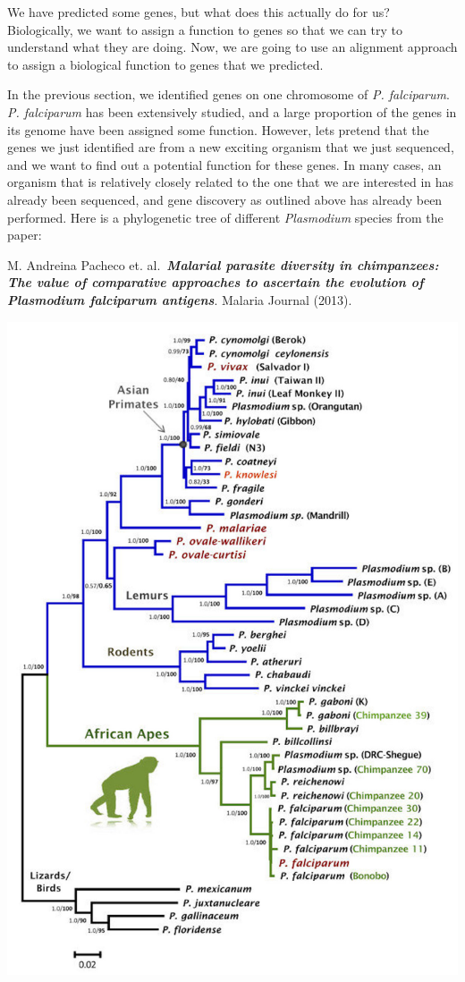 \documentclass[11pt]{article}
\begin{document}
We have predicted some genes, but what does this actually do for us?
Biologically, we want to assign a function to genes so that we can try
to understand what they are doing. Now, we are going to use an alignment
approach to assign a biological function to genes that we predicted.

In the previous section, we identified genes on one chromosome of
\textit{P. falciparum}. \textit{P. falciparum} has been extensively studied,
and a large proportion of the genes in its genome have been assigned
some function. However, lets pretend that the genes we just identified
are from a new exciting organism that we just sequenced, and we want to
find out a potential function for these genes. In many cases, an
organism that is relatively closely related to the one that we are
interested in has already been sequenced, and gene discovery as outlined
above has already been performed. Here is a phylogenetic tree of
different \textit{Plasmodium} species from the paper:

M. Andreina Pacheco et. al.~\textit{\textbf{Malarial parasite diversity in
chimpanzees: The value of comparative approaches to ascertain the
evolution of Plasmodium falciparum antigens}}. Malaria Journal (2013).

\includegraphics{images/comparative_1.png}
\end{document}
